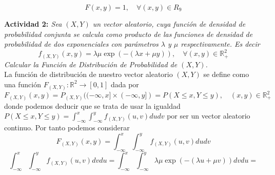 \documentclass[a4paper, 12pt]{article}
\def\R{\mathds{R}}
\begin{document}
    $$F(x,y)=1, \quad \forall (x,y) \in R_9$$
\begin{comment}

    Para el primer recinto estudiemos la siguiente integral:
    $$F_{(X,Y)}(x,y)=\int _{-\infty}^x \int _{-\infty}^y f_{(X,Y)}(u,v) dvdu = \int _{-1}^x \int _{u}^y \frac{12}{5}v^2 dvdu =
    \frac{12}{5} \int _{-1}^x \left[\frac{v^3}{3}\right]_{u}^y du = $$
    $$\frac{12}{15} \int _{-1}^x y^3-u^3 du = 
    \frac{12}{15} \left[y^3u-\frac{u^4}{4}\right]_{-1}^x = \frac{12}{15} \left[y^3x - \frac{x^4}{4} + y^3 + \frac{1}{4}\right]$$
    
    Para el segundo recinto tenemos:
    $$F_{(X,Y)}(x,y)=\int _{-\infty}^x \int _{-\infty}^y f_{(X,Y)}(u,v) dvdu = \int _{0}^x \int _{u^2}^y \frac{12}{5}v^2 dvdu =
    \frac{12}{5} \int _{0}^x \left[\frac{v^3}{3}\right]_{u^2}^y du = $$
    $$\frac{12}{15} \int _{0}^x y^3-u^6 du = \frac{12}{15} \left[y^3u-\frac{u^7}{7}\right]_{0}^x = \frac{12}{105} \left[7y^3x-x^7\right]$$

    Por lo tanto obtenemos la expresión de la función de densidad de probabilidad
    
    \begin{equation*} F_{(X,Y)}(x,y)=
        \left\{
            \begin{aligned}
                \frac{12}{15} \left[y^3x - \frac{x^4}{4} + y^3 + \frac{1}{4}\right], \quad -1 \leq x \leq 0; -1\leq x\leq y\leq x^2 \\
                \frac{12}{105} \left[7y^3x-x^7\right], \quad 0\leq x\leq 1;0\leq x^2 \leq y\leq 1
            \end{aligned}
        \right.
    \end{equation*}
\end{comment}

    \newpage

    {\bf{Actividad 2: }} {\textit{Sea $(X, Y)$ un vector aleatorio, cuya función de densidad de probabilidad conjunta se calcula 
    como producto de las funciones de densidad de probabilidad de dos exponenciales con parámetros $\lambda$ y $\mu$ 
    respectivamente. Es decir
    $$f_{(X,Y)}(x,y) = \lambda \mu \exp (-(\lambda x + \mu y)), \quad \forall (x,y) \in \R _+^2$$
    Calcular la Función de Distribución de Probabilidad de $(X, Y)$.}}\\

    La función de distribución de nuestro vector aleatorio $(X,Y)$ se define como una función 
    $F_{(X,Y)}:\R^2 \rightarrow[0,1]$ dada por
    $$F_{(X,Y)}(x,y) = P_{(X,Y)}((-\infty, x]\times(-\infty, y]) = P(X\leq x, Y\leq y), \quad (x,y) \in \R _+^2$$
    donde podemos deducir que se trata de usar la igualdad 
    $P(X\leq x, Y\leq y)=\int _{-\infty}^x \int _{-\infty}^y f_{(X,Y)}(u,v) du dv$
    por ser un vector aleatorio continuo. Por tanto podemos considerar
    $$F_{(X,Y)}(x,y) = \int _{-\infty}^x \int _{-\infty}^y f_{(X,Y)}(u,v) du dv$$
    $$\int _{-\infty}^x \int _{-\infty}^y f_{(X,Y)}(u,v) dv du = 
    \int _{-\infty}^x \int _{-\infty}^y \lambda \mu \exp (-(\lambda u + \mu v)) dv du = $$
\end{document}
